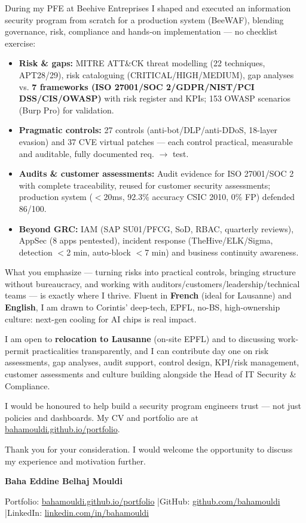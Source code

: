 \documentclass[a4paper,10pt]{article}
\begin{document}
During my PFE at Beehive Entreprises I shaped and executed an information security program from scratch for a production system (BeeWAF), blending governance, risk, compliance and hands-on implementation — no checklist exercise:
\begin{itemize}
  \item \textbf{Risk \& gaps:} MITRE ATT\&CK threat modelling (22 techniques, APT28/29), risk cataloguing (CRITICAL/HIGH/MEDIUM), gap analyses vs. \textbf{7 frameworks (ISO 27001/SOC 2/GDPR/NIST/PCI DSS/CIS/OWASP)} with risk register and KPIs; 153 OWASP scenarios (Burp Pro) for validation.
  \item \textbf{Pragmatic controls:} 27 controls (anti-bot/DLP/anti-DDoS, 18-layer evasion) and 37 CVE virtual patches — each control practical, measurable and auditable, fully documented req. $\to$ test.
  \item \textbf{Audits \& customer assessments:} Audit evidence for ISO 27001/SOC 2 with complete traceability, reused for customer security assessments; production system ($<$20ms, 92.3\% accuracy CSIC 2010, 0\% FP) defended 86/100.
  \item \textbf{Beyond GRC:} IAM (SAP SU01/PFCG, SoD, RBAC, quarterly reviews), AppSec (8 apps pentested), incident response (TheHive/ELK/Sigma, detection $<$2 min, auto-block $<$7 min) and business continuity awareness.
\end{itemize}
What you emphasize — turning risks into practical controls, bringing structure without bureaucracy, and working with auditors/customers/leadership/technical teams — is exactly where I thrive. Fluent in \textbf{French} (ideal for Lausanne) and \textbf{English}, I am drawn to Corintis' deep-tech, EPFL, no-BS, high-ownership culture: next-gen cooling for AI chips is real impact.

I am open to \textbf{relocation to Lausanne} (on-site EPFL) and to discussing work-permit practicalities transparently, and I can contribute day one on risk assessments, gap analyses, audit support, control design, KPI/risk management, customer assessments and culture building alongside the Head of IT Security \& Compliance.

I would be honoured to help build a security program engineers trust — not just policies and dashboards. My CV and portfolio are at \href{https://bahamouldi.github.io/portfolio/}{bahamouldi.github.io/portfolio}.

Thank you for your consideration. I would welcome the opportunity to discuss my experience and motivation further.

\vspace{0.6cm}

\begin{flushright}
{\bfseries Baha Eddine Belhaj Mouldi}
\end{flushright}

\vspace{0.3cm}
{\small Portfolio: \href{https://bahamouldi.github.io/portfolio/}{bahamouldi.github.io/portfolio} \quad|\quad GitHub: \href{https://github.com/bahamouldi}{github.com/bahamouldi} \quad|\quad LinkedIn: \href{https://linkedin.com/in/bahamouldi}{linkedin.com/in/bahamouldi}}
\end{document}
